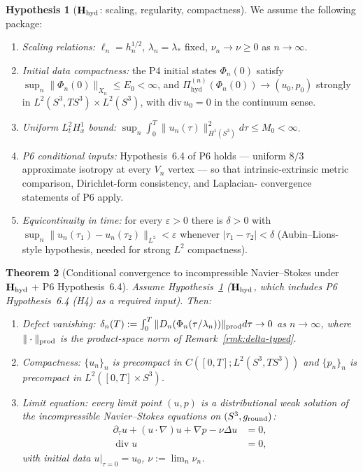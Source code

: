\documentclass[11pt, a4paper]{amsart}
\newtheorem{theorem}{Theorem}[section]
\theoremstyle{definition}
\newtheorem{hypothesis}[theorem]{Hypothesis}
\newcommand{\Pihyd}{\Pi_{\mathrm{hyd}}}
\begin{document}
\begin{hypothesis}[$\mathbf H_{\rm hyd}$: scaling, regularity, compactness]
\label{hyp:scaling}
We assume the following package:
\begin{enumerate}
\item[\textup{(H1)}] \emph{Scaling relations:} $\ell_n =
  h_n^{1/2}$, $\lambda_n = \lambda_\ast$ fixed,
  $\nu_n \to \nu \geq 0$ as $n \to \infty$.
\item[\textup{(H2)}] \emph{Initial data compactness:} the P4
  initial states $\Phi_n(0)$ satisfy
  $\sup_n \|\Phi_n(0)\|_{X_n} \leq E_0 < \infty$, and
  $\Pihyd^{(n)}(\Phi_n(0)) \to (u_0, p_0)$ strongly in
  $L^2(S^3, TS^3) \times L^2(S^3)$, with
  $\mathrm{div}\,u_0 = 0$ in the continuum sense.
\item[\textup{(H3)}] \emph{Uniform $L^2_t H^1_x$ bound:}
  $\sup_n \int_0^T \|u_n(\tau)\|_{H^1(S^3)}^2 d\tau \leq M_0 <
  \infty$.
\item[\textup{(H4)}] \emph{P6 conditional inputs:}
  Hypothesis~6.4 of P6 holds — uniform $8/3$ approximate isotropy
  at every $V_n$ vertex — so that intrinsic-extrinsic metric
  comparison, Dirichlet-form consistency, and Laplacian-
  convergence statements of P6 apply.
\item[\textup{(H5)}] \emph{Equicontinuity in time:} for every
  $\varepsilon > 0$ there is $\delta > 0$ with
  $\sup_n \|u_n(\tau_1) - u_n(\tau_2)\|_{L^2} < \varepsilon$
  whenever $|\tau_1 - \tau_2| < \delta$ (Aubin--Lions-style
  hypothesis, needed for strong $L^2$ compactness).
\end{enumerate}
\end{hypothesis}

\begin{theorem}[Conditional convergence to incompressible
  Navier--Stokes under $\mathbf H_{\rm hyd}$ + P6 Hypothesis~6.4]
\label{thm:ns-limit}
Assume Hypothesis~\ref{hyp:scaling} ($\mathbf H_{\rm hyd}$,
which includes P6 Hypothesis~6.4 (H4) as a required input).
Then:
\begin{enumerate}
\item[\textup{(i)}] \emph{Defect vanishing:}
  $\delta_n(T) := \int_0^T \|D_n(\Phi_n(\tau/\lambda_n))\|_
  {\rm prod} d\tau \to 0$ as $n \to \infty$, where
  $\|\cdot\|_{\rm prod}$ is the product-space norm of
  Remark~\ref{rmk:delta-typed}.
\item[\textup{(ii)}] \emph{Compactness:} $\{u_n\}_n$ is
  precompact in $C([0, T]; L^2(S^3, TS^3))$ and $\{p_n\}_n$ is
  precompact in $L^2([0, T] \times S^3)$.
\item[\textup{(iii)}] \emph{Limit equation:} every limit point
  $(u, p)$ is a distributional weak solution of the incompressible
  Navier--Stokes equations on $(S^3, g_{\rm round})$:
  \begin{align*}
    \partial_\tau u + (u \cdot \nabla) u + \nabla p - \nu
       \Delta u &= 0, \\
    \operatorname{div} u &= 0,
  \end{align*}
  with initial data $u|_{\tau=0} = u_0$, $\nu := \lim_n
  \nu_n$.
\end{enumerate}

\end{theorem}
\end{document}
